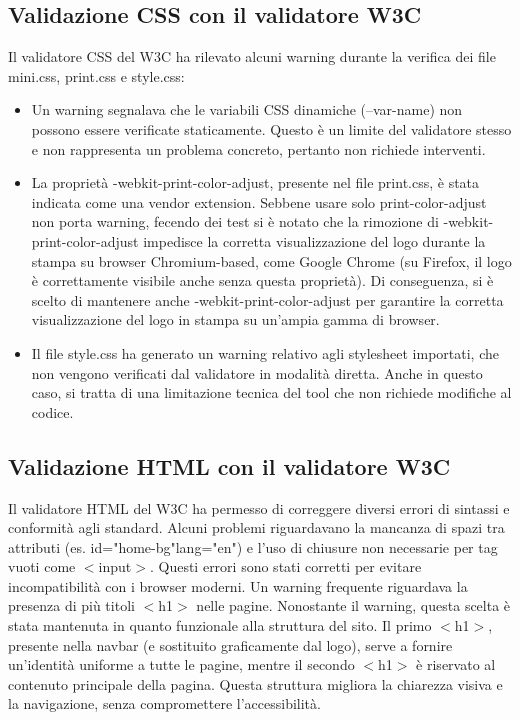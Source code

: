 \documentclass[10pt]{article}
\begin{document}
\subsection{Validazione CSS con il validatore W3C}
Il validatore CSS del W3C ha rilevato alcuni warning durante la verifica dei file mini.css, print.css e style.css:
\begin{itemize}
\item Un warning segnalava che le variabili CSS dinamiche (--var-name) non possono essere verificate staticamente. Questo è un limite del validatore stesso e non rappresenta un problema concreto, pertanto non richiede interventi.
\item La proprietà -webkit-print-color-adjust, presente nel file print.css, è stata indicata come una vendor extension. Sebbene usare solo print-color-adjust non porta warning, fecendo dei test si è notato che la rimozione di -webkit-print-color-adjust impedisce la corretta visualizzazione del logo durante la stampa su browser Chromium-based, come Google Chrome (su Firefox, il logo è correttamente visibile anche senza questa proprietà). Di conseguenza, si è scelto di mantenere anche -webkit-print-color-adjust per garantire la corretta visualizzazione del logo in stampa su un’ampia gamma di browser.
\item Il file style.css ha generato un warning relativo agli stylesheet importati, che non vengono verificati dal validatore in modalità diretta. Anche in questo caso, si tratta di una limitazione tecnica del tool che non richiede modifiche al codice.
\end{itemize}

\subsection{Validazione HTML con il validatore W3C}
Il validatore HTML del W3C ha permesso di correggere diversi errori di sintassi e conformità agli standard. Alcuni problemi riguardavano la mancanza di spazi tra attributi (es. id="home-bg"lang="en") e l’uso di chiusure non necessarie per tag vuoti come $<$input$>$. Questi errori sono stati corretti per evitare incompatibilità con i browser moderni.
Un warning frequente riguardava la presenza di più titoli $<$h1$>$ nelle pagine. Nonostante il warning, questa scelta è stata mantenuta in quanto funzionale alla struttura del sito. Il primo $<$h1$>$, presente nella navbar (e sostituito graficamente dal logo), serve a fornire un’identità uniforme a tutte le pagine, mentre il secondo $<$h1$>$ è riservato al contenuto principale della pagina. Questa struttura migliora la chiarezza visiva e la navigazione, senza compromettere l’accessibilità.
\end{document}
